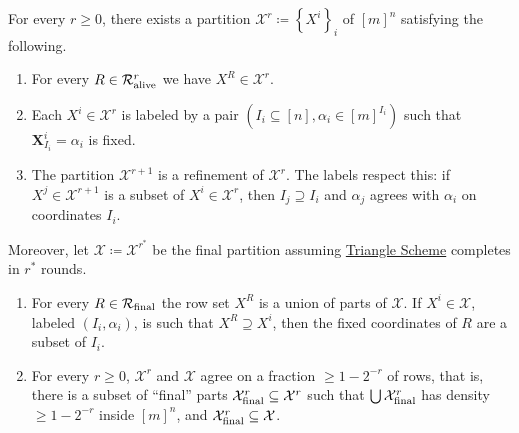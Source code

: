 \documentclass{toc}
\newcommand{\trischeme}{\hyperref[alg:tri-partition]{Triangle Scheme}\xspace}
\newcommand{\X}{\bm{X}}
\newcommand{\calR}{\mathcal{R}}
\newcommand{\calX}{\mathcal{X}}
\newcommand{\allX}{[m]^n}
\newcommand{\set}[1]{\left \{ #1 \right \}}
\newcommand{\alive}{\text{\upshape alive}}
\newcommand{\final}{\text{\upshape final}}
\begin{document}
\begin{lemma} \label{lem:invariants}
For every $r\geq 0$, there exists a partition $\calX^r \coloneqq \set{X^i}_i$ of $\allX$ satisfying the following.%
\begin{enumerate}[label={\upshape(P\arabic*)},leftmargin=13mm]
		\item \label{p1} For every $R \in \calR^r_{\alive}$ we have $X^R \in \calX^r$.
		\item \label{p2} Each $X^i \in \calX^r$ is labeled by a pair $(I_i \subseteq [n], \alpha_i \in [m]^{I_i})$ such that $\X^i_{I_i} = \alpha_i$ is fixed.
		\item \label{p3} The partition $\calX^{r+1}$ is a refinement of $\calX^r$. The labels respect this: if $X^j \in \calX^{r+1}$ is a subset of $X^i \in \calX^r$, then $I_j \supseteq I_i$ and $\alpha_j$ agrees with $\alpha_i$ on coordinates $I_i$.
\end{enumerate}
Moreover, let $\calX \coloneqq \calX^{r^*}$ be the final partition assuming \trischeme completes in $r^*$ rounds.
\begin{enumerate}[label={\upshape(P\arabic*)},leftmargin=13mm,resume]
		\item \label{p4} For every $R\in\calR_{\final}$ the row set $X^R$ is a union of parts of $\calX$. If $X^i\in\calX$, labeled $(I_i,\alpha_i)$, is such that $X^R\supseteq X^i$, then the fixed coordinates of $R$ are a subset of $I_i$.
		\item \label{p5}
		For every $r\geq0$, $\calX^r$ and $\calX$ agree on a fraction $\geq 1-2^{-r}$ of rows, that is, there is a subset of ``final'' parts $\calX^r_{\final}\subseteq\calX^r$ such that $\bigcup\calX^r_{\final}$ has density $\geq 1-2^{-r}$ inside $[m]^n$, and $\calX^r_{\final}\subseteq\calX$.
\end{enumerate}
\end{lemma}
\end{document}

